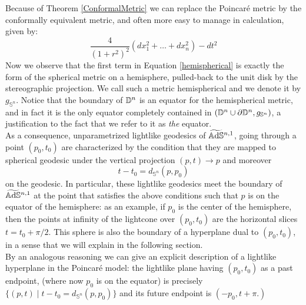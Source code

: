 Because of Theorem \ref{ConformalMetric} we can replace the Poincaré metric by the conformally equivalent metric, and often more easy to manage in calculation, given by:
 \begin{equation}\label{hemispherical}
     \frac{4}{(1+r^2)^2}(dx_1^2+\dots+dx_n^2)-dt^2
 \end{equation} 
 Now we observe that the first term in Equation \ref{hemispherical} is exactly the form of the spherical metric on a hemisphere, pulled-back to the unit disk by the stereographic projection. We call such a metric hemispherical and we denote it by $g_{\mathbb{S}^n}$. Notice that the boundary of $\mathbb{D}^n$ is an equator for the hemispherical metric, and in fact it is the only equator completely contained in $(\mathbb{D}^n\cup\partial\mathbb{D}^n,g_{\mathbb{S}^n})$, a justification to the fact that we refer to it as \textit{the} equator.\\
 As a consequence, unparametrized lightlike geodesics of $\widetilde{\mathbb{A}\mathrm{d}\mathbb{S}}{}^{n,1}$, going through a point $(p_0,t_0)$ are characterized by the condition that they are mapped to spherical geodesic under the vertical projection $(p,t)\to p$ and moreover
 \[
     t-t_0=d_{\mathbb{S}^n}(p,p_0)
 \] on the geodesic. In particular, these lightlike geodesics meet the boundary of $\widetilde{\mathbb{A}\mathrm{d}\mathbb{S}}{}^{n,1}$ at the point that satisfies the above conditions such that $p$ is on the equator of the hemisphere: as an example, if $p_0$ is the center of the hemisphere, then the points at infinity of the lightcone over $(p_0,t_0)$ are the horizontal slices $t=t_{0}+\pi/2.$ This sphere is also the boundary of a hyperplane dual to $(p_0,t_0)$, in a sense that we will explain in the following section. \\
 By an analogous reasoning we can give an explicit description of a lightlike hyperplane in the Poincaré model: the lightlike plane having $(p_0,t_0)$ as a past endpoint, (where now $p_0$ is on the equator) is precisely $\{(p,t)\;|\;t-t_0=d_{\mathbb{S}^n}(p,p_0)\}$ and its future endpoint is $(-p_0,t+\pi.)$ 

